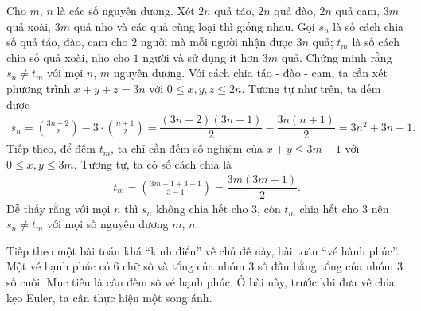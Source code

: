 \begin{bt}%
 Cho $m$, $n$ là các số nguyên dương. Xét $2n$ quả táo, $2n$ quả đào, $2n$ quả cam, $3m$ quả xoài, $3m$ quả nho và các quả cùng loại thì giống nhau. Gọi $s_n$ là số cách chia số quả táo, đào, cam cho $2$ người mà mỗi người nhận  được $3n$ quả; $t_m$ là số cách chia số quả xoài, nho cho $1$ người và sử dụng ít hơn $3m$ quả. Chứng minh rằng $s_n \neq t_m$ với mọi $n$, $m$ nguyên dương.
 \loigiai
 {
 Với cách chia táo - đào - cam, ta cần xét phương trình $x + y + z = 3n $ với $0 \leq x,y,z \leq 2n$. Tương tự như trên, ta đếm được
 \begin{eqnarray*}
  s_n={3n+2 \choose 2}-3\cdot {n+1 \choose 2} = \dfrac{(3n+2)(3n+1)}{2}-\dfrac{3n(n+1)}{2}=3n^2+3n+1.
 \end{eqnarray*}
 Tiếp theo, để đếm $t_m$, ta chỉ cần đếm số nghiệm của $x + y \leq 3m - 1$ với $0 \leq x,y \leq 3m$. Tương tự, ta có số cách chia là
 \begin{eqnarray*}
  t_m={3m-1+3-1 \choose 3-1} = \dfrac{3m(3m+1)}{2}.
 \end{eqnarray*}
 Dễ thấy rằng với mọi $n$ thì $s_n$ không chia hết cho $3$, còn $t_m$ chia hết cho $3$ nên $s_n \neq t_m$ với mọi số nguyên dương $m$, $n$.
 }
\end{bt}
\noindent Tiếp theo một bài toán khá ``kinh điển'' về chủ đề này, bài toán ``vé hành phúc''. Một vé hạnh phúc có $6$ chữ số và tổng của nhóm $3$ số đầu bằng tổng của nhóm $3$ số cuối. Mục tiêu là cần đếm số vé hạnh phúc. Ở bài này, trước khi đưa về chia kẹo Euler, ta cần thực hiện một song ánh.

